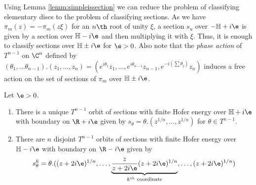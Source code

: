 \begin{remark} \label{remark:onlyupperisenough}
    Using Lemma \ref{lemm:simpleissection} we can reduce the problem of classifying elementary discs to the problem of classifying sections. As  we have $\pi_m(z) = -\pi_m (z\xi)$  for an $n\th$ root of unity $\xi$, a section $s_u$ over $-\mathbb{H} + i\e$ is given by a section over $\mathbb{H}-i\e$ and then multiplying it with $\xi$. Thus, it is enough to classify sections over $\mathbb{H}\pm i\e$ for $\e > 0$. Also note that the \textit{phase action} of $T^{n-1}$ on $\C^n$ defined by $(\theta_1,\dots \theta_{n-1}).(z_1,\dots,z_n)= (e^{i\theta_1}z_1,\dots,e^{i\theta_{n-1}}z_{n-1}, e^{-i(\sum \theta_j)}z_n)$ induces a free action on the set of sections of $\pi_m$ over $\mathbb{H}\pm i\e$. 
\end{remark}

\begin{Theorem}\label{thm:classif}
Let $\e > 0$.
\begin{enumerate}
  

    \item There is a unique $T^{n-1}$ orbit of sections with finite Hofer energy over $\mathbb{H}+i\e$ with boundary on $\R+i\e$ given by $s_\theta = \theta.(z^{1/n}, \dots , z^{1/n} )$ for $\theta \in T^{n-1}$.
    \item There are $n$ disjoint $T^{n-1}$ orbits of sections with finite Hofer energy over $\mathbb{H}-i\e$ with boundary on $\R-i\e$ given by $$s^k_\theta = \theta .((z+2i\e)^{1/n} , \dots,  \underbrace{\frac{z}{z+2i\e} (z+2i\e)^{1/n}}_{k^{th}\text{ coordinate}} , \dots , (z+2i\e)^{1/n} )$$
\end{enumerate}

\end{Theorem}


